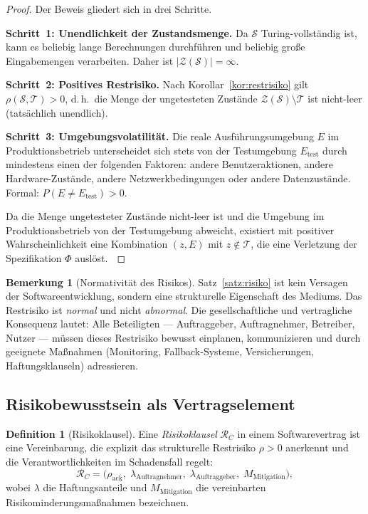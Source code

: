 ﻿\documentclass[a4paper,12pt]{article}
\theoremstyle{definition}
\newtheorem{definition}{Definition}
\newtheorem{bemerkung}{Bemerkung}
\newenvironment{beweis}{\begin{proof}}{\end{proof}}
\begin{document}
\begin{beweis}
    Der Beweis gliedert sich in drei Schritte.

    \textbf{Schritt~1: Unendlichkeit der Zustandsmenge.}
    Da $\mathcal{S}$ Turing-vollst\"andig ist, kann es beliebig lange Berechnungen
    durchf\"uhren und beliebig gro\ss{}e Eingabemengen verarbeiten. Daher ist
    $|\mathcal{Z}(\mathcal{S})| = \infty$.

    \textbf{Schritt~2: Positives Restrisiko.}
    Nach Korollar~\ref{kor:restrisiko} gilt $\rho(\mathcal{S}, \mathcal{T}) > 0$, d.\,h.\
    die Menge der ungetesteten Zust\"ande $\mathcal{Z}(\mathcal{S}) \setminus \mathcal{T}$
    ist nicht-leer (tats\"achlich unendlich).

    \textbf{Schritt~3: Umgebungsvolatilit\"at.}
    Die reale Ausf\"uhrungsumgebung $E$ im Produktionsbetrieb unterscheidet sich stets
    von der Testumgebung $E_{\mathrm{test}}$ durch mindestens einen der folgenden Faktoren:
    andere Benutzeraktionen, andere Hardware-Zust\"ande, andere Netzwerkbedingungen oder
    andere Datenzust\"ande. Formal: $P(E \neq E_{\mathrm{test}}) > 0$.

    Da die Menge ungetesteter Zust\"ande nicht-leer ist und die Umgebung im Produktionsbetrieb
    von der Testumgebung abweicht, existiert mit positiver Wahrscheinlichkeit eine Kombination
    $(z, E)$ mit $z \notin \mathcal{T}$, die eine Verletzung der Spezifikation $\Phi$ ausl\"ost.
    $\qedhere$
\end{beweis}

\begin{bemerkung}[Normativit\"at des Risikos]
    Satz~\ref{satz:risiko} ist kein Versagen der Softwareentwicklung, sondern eine strukturelle
    Eigenschaft des Mediums. Das Restrisiko ist \emph{normal} und nicht \emph{abnormal}.
    Die gesellschaftliche und vertragliche Konsequenz lautet: Alle Beteiligten ---
    Auftraggeber, Auftragnehmer, Betreiber, Nutzer --- m\"ussen dieses Restrisiko bewusst
    einplanen, kommunizieren und durch geeignete Ma\ss{}nahmen (Monitoring, Fallback-Systeme,
    Versicherungen, Haftungsklauseln) adressieren.
\end{bemerkung}

\subsection{Risikobewusstsein als Vertragselement}

\begin{definition}[Risikoklausel]
    Eine \emph{Risikoklausel} $\mathcal{R}_C$ in einem Softwarevertrag ist eine Vereinbarung,
    die explizit das strukturelle Restrisiko $\rho > 0$ anerkennt und die Verantwortlichkeiten
    im Schadensfall regelt:
    \[
        \mathcal{R}_C = \bigl(\rho_{\mathrm{ack}},\; \lambda_{\text{Auftragnehmer}},\;
                               \lambda_{\text{Auftraggeber}},\; M_{\mathrm{Mitigation}}\bigr),
    \]
    wobei $\lambda$ die Haftungsanteile und $M_{\mathrm{Mitigation}}$ die vereinbarten
    Risikominderungsma\ss{}nahmen bezeichnen.
\end{definition}
\end{document}
